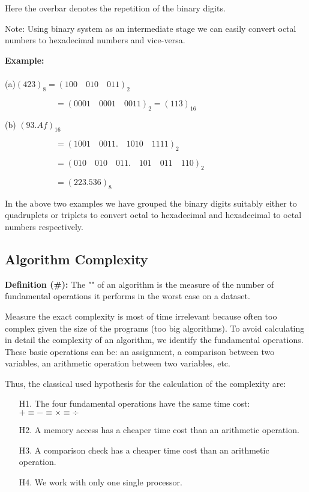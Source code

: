 	Here the overbar denotes the repetition of the binary digits.
	
	Note: Using binary system as an intermediate stage we can easily convert octal numbers to hexadecimal numbers and vice-versa.
	\begin{tcolorbox}[colframe=black,colback=white,sharp corners]
	\textbf{{\Large {}}Example:}\\\\
	(a)$(423)_{8}=(100\quad 010\quad 011)_{2}$
	
	$\qquad\qquad\qquad=(0001\quad 0001\quad 0011)_{2}=(113)_{16}$
	
	(b) $(93.Af)_{16}$
	
	$\qquad\qquad\qquad=(1001\quad0011.\quad1010\quad1111)_{2}$
	
	$\qquad\qquad\qquad=(010\quad010\quad011.\quad101\quad011\quad110)_{2}$
	
	$\qquad\qquad\qquad=(223.536)_{8}$
	\end{tcolorbox}
	
	In the above two examples we have grouped the binary digits suitably either to quadruplets or triplets to convert octal to hexadecimal and hexadecimal to octal numbers respectively.



	\pagebreak	
	\subsection{Algorithm Complexity }

\textbf{Definition (\#\mydef):} The "" of an algorithm is the measure of the number of fundamental operations it performs in the worst case on a dataset.

Measure the exact complexity is most of time irrelevant because often too complex given the size of the programs (too big algorithms). To avoid calculating in detail the complexity of an algorithm, we identify the fundamental operations. These basic operations can be: an assignment, a comparison between two variables, an arithmetic operation between two variables, etc.

Thus, the classical used hypothesis for the calculation of the complexity are:

	\begin{enumerate}
		\item[H1.] The four fundamental operations have the same time cost: $+ \equiv - \equiv \times \equiv \div$
		\item[H2.] A memory access has a cheaper time cost than an arithmetic operation.
		\item[H3.] A comparison check has a cheaper time cost than an arithmetic operation.
		\item[H4.] We work with only one single processor.
	\end{enumerate}
	
